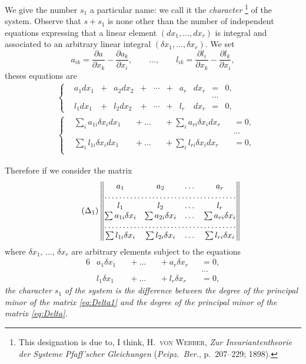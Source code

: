 \documentclass[leqno,11pt]{book}
\newcommand{\pd}{\partial}
\theoremstyle{shape1}
\theoremstyle{shapesmall}
\begin{document}
We give the number $s_{1}$ a particular name: we call it the \emph{character} \footnote{This designation is due to, I think, H.~\textsc{von Webber}, \emph{Zur Invariantentheorie der Systeme Pfaff'scher Gleichungen} (\emph{Peipz.~Ber.}, p.~207--229; 1898).} of the system. Observe that $s+s_{1}$ is none other than the number of independent equations expressing that a linear element $(dx_{1},\dots,dx_{r})$ is integral and associated to an arbitrary linear integral $(\delta x_{1},\dots, \delta x_{r})$. We set
\[
a_{ik}=\frac{\pd a}{\pd x_{k}}-\frac{\pd a_{k}}{\pd x_{i}},\qquad\dots,\qquad l_{ik}=\frac{\pd l_{i}}{\pd x_{k}}-\frac{\pd l_{k}}{\pd x_{i}},
\]
theses equations are
\begin{align*}
  \label{2.1}\tag{1}
  &\left\{
    \begin{alignedat}{30}
      &a_{1}dx_{1}&{}+{}&a_{2}dx_{2}&{}+{}&\cdots&{}+{}&a_{r}&dx_{r}&{}={}&0,\\
      &&&&&&&&&\cdots\\
      &l_{1}dx_{1}&{}+{}&l_{2}dx_{2}&{}+{}&\cdots&{}+{}&l_{r}&dx_{r}&{}={}&0,      
    \end{alignedat}
  \right.\\
  \label{2.2}\tag{2}
  &\left\{
    \begin{alignedat}{20}
      &\sum_{i}a_{1i}\delta x_{i}dx_{1}&&{}+{}\dots&&{}+{}\sum_{i}a_{ri}\delta x_{i}dx_{r}&&{}={}0,\\
      &&&&&&&\cdots\\
      &\sum_{i}l_{1i}\delta x_{i}dx_{1}&&{}+{}\dots&&{}+{}\sum_{i}l_{ri}\delta x_{i}dx_{r}&&{}={}0,\\      
    \end{alignedat}
  \right.
\end{align*}

Therefore if we consider the matrix
\begin{equation}
  \label{eq:Delta1}\tag{$\Delta_{1}$}
  \begin{Vmatrix}
    a_{1}&a_{2}&\dots&a_{r}\\
    \hdotsfor{4}\\
    l_{1}&l_{2}&\dots&l_{r}\\
    \sum a_{1i}\delta x_{i}&\sum a_{2i}\delta x_{i}&\dots&\sum a_{ri}\delta x_{i}\\
    \hdotsfor{4}\\
    \sum l_{1i}\delta x_{i}&\sum l_{2i}\delta x_{i}&\dots&\sum l_{ri}\delta x_{i}
  \end{Vmatrix}
\end{equation}
where $\delta x_{1}$, $\dots$, $\delta x_{r}$ are arbitrary elements subject to the equations
\begin{alignat*}{6}
  &a_{1}\delta x_{1}&&{}+{}\dots&&{}+{}a_{r}\delta x_{r}&&=0,\\
  &&&&&&&\dots\\
  &l_{1}\delta x_{1}&&{}+{}\dots&&{}+{}l_{r}\delta x_{r}&&=0,
\end{alignat*}
\emph{the character $s_{1}$ of the system is the difference between the degree of the principal minor of the matrix \eqref{eq:Delta1} and the degree of the principal minor of the matrix \eqref{eq:Delta}.}
\end{document}
